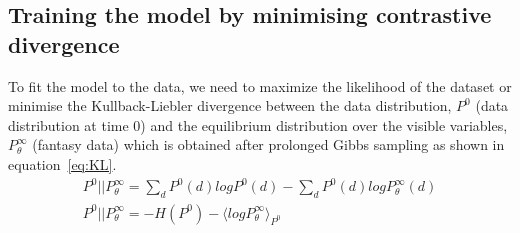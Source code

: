 \documentclass{sig-alternate}
\begin{document}
\subsection{Training the model by minimising contrastive divergence}

To fit the model to the data, we need to maximize the likelihood of the dataset or minimise the Kullback-Liebler divergence between the data distribution, $P^0$ (data distribution at time 0) and the equilibrium distribution over the visible variables, $P^\infty_\theta$ (fantasy data) which is obtained after prolonged Gibbs sampling as shown in equation~\ref{eq:KL}. 
\begin{align}
P^0 || P^\infty_\theta = \sum_{d}P^0 (d)logP^0(d) - \sum_{d}P^0 (d)logP^\infty_\theta(d) \label{eq:KL} \\
P^0 || P^\infty_\theta = -H(P^0) - \langle log P^\infty_\theta \rangle_{P^{0}}
\end{align}
\end{document}
